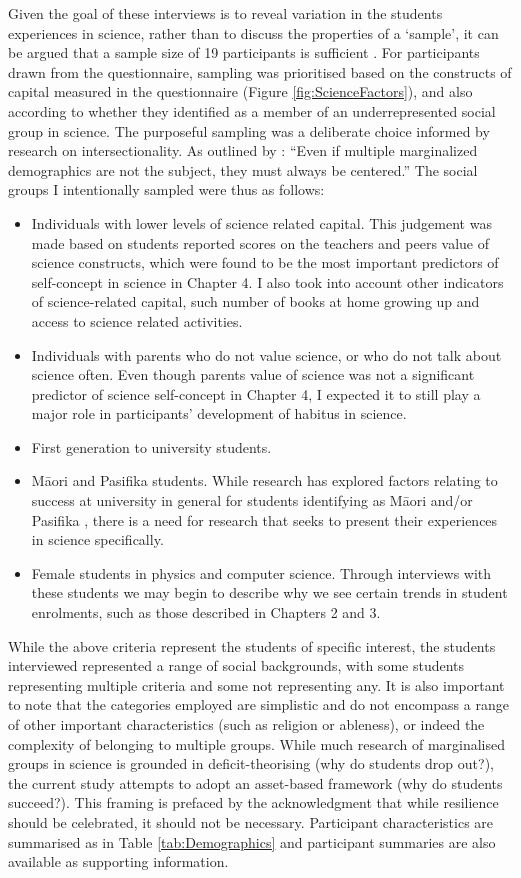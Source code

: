 Given the goal of these interviews is to reveal variation in the students experiences in science, rather than to discuss the properties of a `sample', it can be argued that a sample size of 19 participants is sufficient \cite{berglund2006students}. For participants drawn from the questionnaire, sampling was prioritised based on the constructs of capital measured in the questionnaire (Figure \ref{fig:ScienceFactors}), and also according to whether they identified as a member of an underrepresented social group in science. The purposeful sampling was a deliberate choice informed by research on intersectionality. As outlined by \cite{duran2019using}: ``Even if multiple marginalized demographics are not the subject, they must always be centered.'' The social groups I intentionally sampled were thus as follows:
\begin{itemize}
    \item Individuals with lower levels of science related capital. This judgement was made based on students reported scores on the teachers and peers value of science constructs, which were found to be the most important predictors of self-concept in science in Chapter 4.  I also took into account other indicators of science-related capital, such number of books at home growing up and access to science related activities.
    \item Individuals with parents who do not value science, or who do not talk about science often. Even though parents value of science was not a significant predictor of science self-concept in Chapter 4, I expected it to still play a major role in participants' development of habitus in science. 
    \item First generation to university students. 
    \item M\={a}ori and Pasifika students. While research has explored factors relating to success at university in general for students identifying as M\={a}ori and/or Pasifika \citep{mayeda2014you}, there is a need for research that seeks to present their experiences in science specifically. 
    \item Female students in physics and computer science. Through interviews with these students we may begin to describe why we see certain trends in student enrolments, such as those described in Chapters 2 and 3.
\end{itemize}
While the above criteria represent the students of specific interest, the students interviewed represented a range of social backgrounds, with some students representing multiple criteria and some not representing any. It is also important to note that the categories employed are simplistic and do not encompass a range of other important characteristics (such as religion or ableness), or indeed the complexity of belonging to multiple groups. While much research of marginalised groups in science is grounded in deficit-theorising (why do students drop out?), the current study attempts to adopt an asset-based framework (why do students succeed?). This framing is prefaced by the acknowledgment that while resilience should be celebrated, it should not be necessary. Participant characteristics are summarised as in Table \ref{tab:Demographics} and participant summaries are also available as supporting information. 


